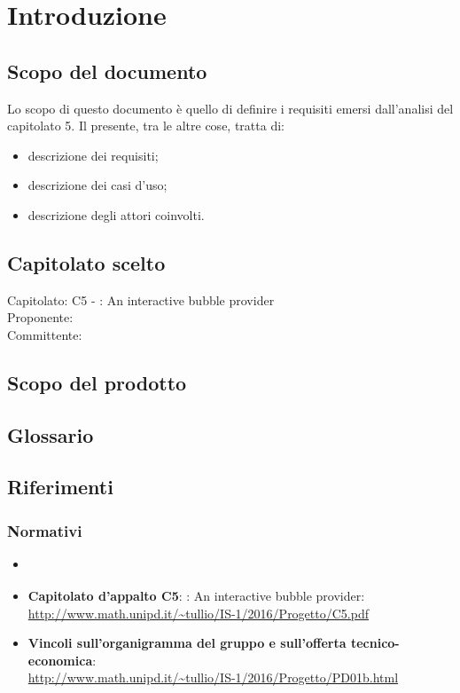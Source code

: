 \section{Introduzione}

\subsection{Scopo del documento}
Lo scopo di questo documento è quello di definire i requisiti emersi dall'analisi del capitolato 5.
Il presente, tra le altre cose, tratta di:
\begin{itemize}
	\item descrizione dei requisiti;
	\item descrizione dei casi d'uso;
	\item descrizione degli attori coinvolti.
\end{itemize}

\subsection{Capitolato scelto}
Capitolato: C5 - \ProjectName{}: An interactive bubble provider \\
Proponente: \Proponente{} \\
Committente: \CommittenteInline{} \\

\subsection{Scopo del prodotto}
\ScopoDelProdotto

\subsection{Glossario}
\GlossarioIntroduzione

\subsection{Riferimenti}
\subsubsection{Normativi}
\begin{itemize}
	\item \textbf{\NormeDiProgetto}
	\item\textbf{Capitolato d'appalto C5}: \ProjectName{}: An interactive bubble provider:\\ \url{http://www.math.unipd.it/~tullio/IS-1/2016/Progetto/C5.pdf}
	\item \textbf{Vincoli sull'organigramma del gruppo e sull'offerta tecnico-economica}: \\ \url{http://www.math.unipd.it/~tullio/IS-1/2016/Progetto/PD01b.html}
\end{itemize}

